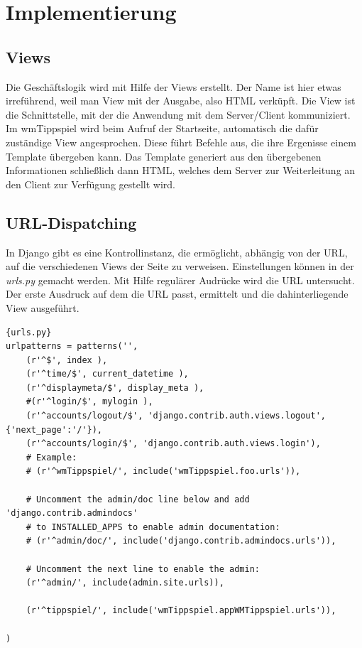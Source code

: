 \chapter{Implementierung}
\section{Views}
Die Geschäftslogik wird mit Hilfe der Views erstellt. Der Name ist hier etwas
irreführend, weil man View mit der Ausgabe, also HTML verküpft. Die View ist die
Schnittstelle, mit der die Anwendung mit dem Server/Client kommuniziert. Im
wmTippspiel wird beim Aufruf der Startseite, automatisch die dafür zuständige
View angesprochen. Diese führt Befehle aus, die ihre Ergenisse einem Template
übergeben kann. Das Template generiert aus den übergebenen Informationen
schließlich dann HTML, welches dem Server zur Weiterleitung an den Client zur
Verfügung gestellt wird.

\section{URL-Dispatching}
In Django gibt es eine Kontrollinstanz, die ermöglicht, abhängig von der URL,
auf die verschiedenen Views der Seite zu verweisen. Einstellungen können in der
\emph{urls.py} gemacht werden. Mit Hilfe regulärer Audrücke wird die URL
untersucht. Der erste Ausdruck auf dem die URL passt, ermittelt und
die dahinterliegende View ausgeführt.

\begin{lstlisting}[caption=Auszug ursl.py]{urls.py}
urlpatterns = patterns('',
    (r'^$', index ),
    (r'^time/$', current_datetime ),
    (r'^displaymeta/$', display_meta ),
    #(r'^login/$', mylogin ),
    (r'^accounts/logout/$', 'django.contrib.auth.views.logout', {'next_page':'/'}),
    (r'^accounts/login/$', 'django.contrib.auth.views.login'),
    # Example:
    # (r'^wmTippspiel/', include('wmTippspiel.foo.urls')),

    # Uncomment the admin/doc line below and add 'django.contrib.admindocs'
    # to INSTALLED_APPS to enable admin documentation:
    # (r'^admin/doc/', include('django.contrib.admindocs.urls')),

    # Uncomment the next line to enable the admin:
    (r'^admin/', include(admin.site.urls)),
    
    (r'^tippspiel/', include('wmTippspiel.appWMTippspiel.urls')),
    
)
\end{lstlisting}


